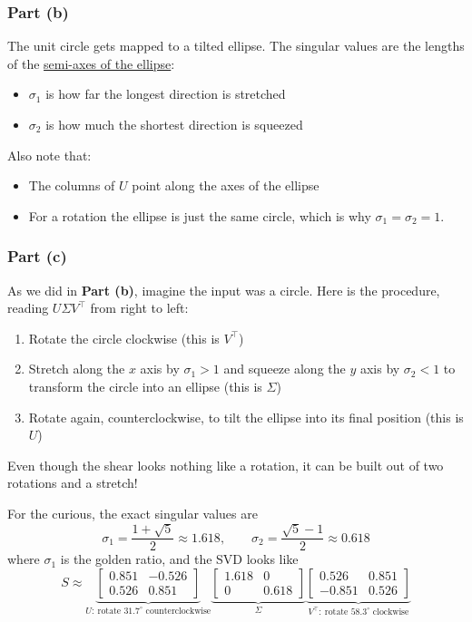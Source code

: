 \documentclass[11pt]{article}
\begin{document}
\subsubsection*{Part (b)}
The unit circle gets mapped to a tilted ellipse. The singular values are the lengths of the \href{https://en.wikipedia.org/wiki/Semi-major_and_semi-minor_axes}{semi-axes of the ellipse}: 
\begin{itemize}
    \item $\sigma_1$ is how far the longest direction is stretched
    \item $\sigma_2$ is how much the shortest direction is squeezed
\end{itemize}
Also note that:
\begin{itemize}
    \item The columns of $U$ point along the axes of the ellipse
    \item For a rotation the ellipse is just the same circle, which is why $\sigma_1=\sigma_2=1$.
\end{itemize}

\subsubsection*{Part (c)}
As we did in \textbf{Part (b)}, imagine the input was a circle. Here is the procedure, reading $U\Sigma V^\top$ from right to left:
\begin{enumerate}
    \item Rotate the circle clockwise (this is $V^\top$)
    \item Stretch along the $x$ axis by $\sigma_1>1$ and squeeze along the $y$ axis by $\sigma_2<1$ to transform the circle into an ellipse (this is $\Sigma$)
    \item Rotate again, counterclockwise, to tilt the ellipse into its final position (this is $U$) 
\end{enumerate}
Even though the shear looks nothing like a rotation, it can be built out of two rotations and a stretch!

For the curious, the exact singular values are
\[
\sigma_1=\frac{1+\sqrt{5}}{2}\approx 1.618,\qquad \sigma_2=\frac{\sqrt{5}-1}{2}\approx 0.618
\]
where $\sigma_1$ is the golden ratio, and the SVD looks like
\[
S\approx\underbrace{\begin{bmatrix}0.851 & -0.526\\0.526 & 0.851\end{bmatrix}}_{U:\ \text{rotate } 31.7^\circ\text{ counterclockwise}}\underbrace{\begin{bmatrix}1.618 & 0\\0 & 0.618\end{bmatrix}}_{\Sigma}\underbrace{\begin{bmatrix}0.526 & 0.851\\-0.851 & 0.526\end{bmatrix}}_{V^\top:\ \text{rotate } 58.3^\circ\text{ clockwise}}
\]
\end{document}
